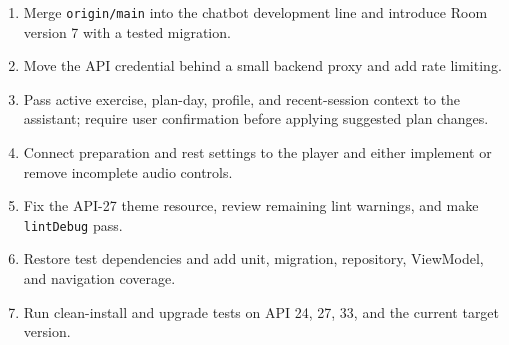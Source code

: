 \begin{enumerate}
    \item Merge \texttt{origin/main} into the chatbot development line and introduce Room version 7 with a tested migration.
    \item Move the API credential behind a small backend proxy and add rate limiting.
    \item Pass active exercise, plan-day, profile, and recent-session context to the assistant; require user confirmation before applying suggested plan changes.
    \item Connect preparation and rest settings to the player and either implement or remove incomplete audio controls.
    \item Fix the API-27 theme resource, review remaining lint warnings, and make \texttt{lintDebug} pass.
    \item Restore test dependencies and add unit, migration, repository, ViewModel, and navigation coverage.
    \item Run clean-install and upgrade tests on API 24, 27, 33, and the current target version.
\end{enumerate}
